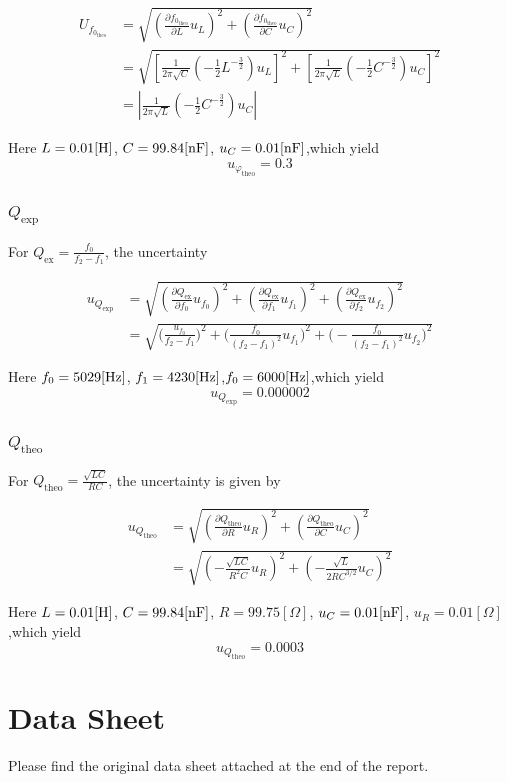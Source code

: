 \documentclass{article}
\begin{document}
\begin{align*}
    U_{f_{0_{\text{theo}}}} & = \sqrt{(\frac{\partial f_{0_{\text{theo}}}}{\partial L}u_L)^2 + (\frac{\partial f_{0_{\text{theo}}}}{\partial C}u_C)^2}                                                                     \\
                            & = \sqrt{\left[\frac{1}{2 \pi \sqrt{C}}\left(-\frac{1}{2} L^{-\frac{3}{2}}\right) u_{L}\right]^{2}+\left[\frac{1}{2 \pi \sqrt{L}}\left(-\frac{1}{2} C^{-\frac{3}{2}}\right) u_{C}\right]^{2}} \\
                            & =\left|\frac{1}{2 \pi \sqrt{L}}\left(-\frac{1}{2} C^{-\frac{3}{2}}\right) u_{C}\right|
\end{align*}

Here $L=0.01[\rm H]$, $C=99.84[\rm nF]$, $u_C=0.01[\rm nF]$,which yield
$$u_{\varphi_\text{theo}} = 0.3$$

\subsubsection{$Q_\text{exp}$}

For $Q_\text{ex} = \frac{f_0}{f_2 - f_1}$, the uncertainty

\begin{align*}
    u_{Q_\text{exp}} & = \sqrt{(\frac{\partial Q_\text{ex}}{\partial f_0}u_{f_0})^2 + (\frac{\partial Q_\text{ex}}{\partial f_1}u_{f_1})^2 + (\frac{\partial Q_\text{ex}}{\partial f_2}u_{f_2})^2}                 \\
                    & = \sqrt{\bigg(\frac{u_{f_0}}{f_2-f_1}\bigg)^2 + \bigg(\frac{f_0}{(f_2-f_1)^2}u_{f_1}\bigg)^2 + \bigg(-\frac{f_0}{(f_2-f_1)^2}u_{f_2}\bigg)^2}                                                                                       
\end{align*}

Here $f_0 = 5029 [\rm Hz]$, $f_1 = 4230 [\rm Hz]$,$f_0 = 6000 [\rm Hz]$,which yield
$$u_{Q_\text{exp}} = 0.000002$$

\subsubsection{$Q_\text{theo}$}

For $Q_\text{theo} = \frac{\sqrt{LC}}{RC}$, the uncertainty is given by

\begin{align*}
    u_{Q_{\text{theo}}} & = \sqrt{(\frac{\partial Q_{\text{theo}}}{\partial R}u_R)^2 + (\frac{\partial Q_{\text{theo}}}{\partial C}u_C)^2} \\
    &= \sqrt{(-\frac{\sqrt{LC}}{R^2C}u_R)^2 + (-\frac{\sqrt{L}}{2RC^{3/2}} u_C)^2}                                     
\end{align*}

Here $L=0.01[\rm H]$, $C=99.84[\rm nF]$, $R=99.75[\Omega]$, $u_C=0.01[\rm nF]$, $u_R=0.01[\Omega]$,which yield
$$u_{Q_\text{theo}} = 0.0003$$

\section{Data Sheet}

Please find the original data sheet attached at the end of the report.
	
\end{document}

